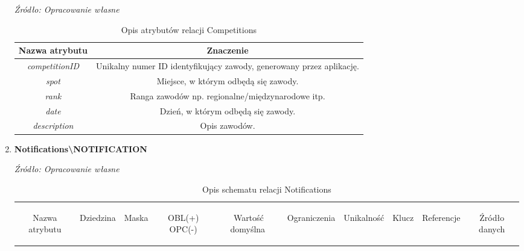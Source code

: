 \documentclass[12pt,twoside]{report}
\begin{document}
\begin{enumerate}[start=1,label={\bfseries REL\textbackslash0\arabic*}]
\begin{table}[H]
	\caption{Opis atrybutów relacji Competitions}
	\textit{Źródło: Opracowanie własne}
	\label{CompetitionsAttributeDescription}
	\centering
	\begin{tabular}{|c|c|}
		\hline
		Nazwa atrybutu & Znaczenie \\
		\hline
		\textit{competitionID} & Unikalny numer ID identyfikujący zawody, generowany przez aplikację.\\
\hline
\textit{spot} & Miejsce, w którym odbędą się zawody.\\
\hline
\textit{rank} & Ranga zawodów np. regionalne/międzynarodowe itp.\\
\hline
\textit{date} & Dzień, w którym odbędą się zawody.\\
\hline
\textit{description}  & Opis zawodów.\\
\hline	
	\end{tabular}
\end{table}
\item \textbf{Notifications\textbackslash NOTIFICATION}
\begin{table}[H]
	\caption{Opis schematu relacji Notifications}
	\textit{Źródło: Opracowanie własne}
	\label{NotificationsRelationSchema}
	\centering
	\begin{tabular}{|c|c|c|c|c|c|c|c|c|c|}
		\hline
		\begin{sideways}Nazwa atrybutu\end{sideways}& 
		\begin{sideways}Dziedzina \end{sideways}& 
		\begin{sideways}Maska \end{sideways}& 
		\begin{sideways}OBL(+) OPC(-)\end{sideways} & 
		\begin{sideways}Wartość domyślna$\ $\end{sideways}& 
		\begin{sideways}Ograniczenia\end{sideways} &
		\begin{sideways}Unikalność \end{sideways}& 
		\begin{sideways}Klucz \end{sideways}& 
		\begin{sideways}Referencje \end{sideways}&
		\begin{sideways}Źródło danych\end{sideways}\\

\end{tabular}
\end{table}
\end{enumerate}
\end{document}
